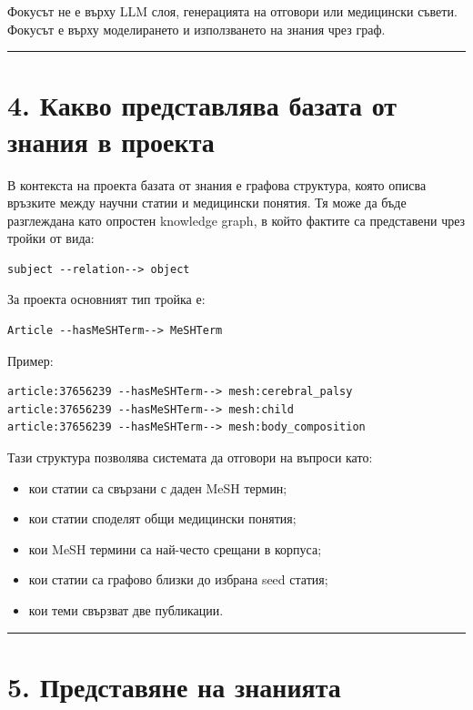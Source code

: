 \documentclass[12pt,a4paper]{article}
\providecommand{\tightlist}{\setlength{\itemsep}{0pt}\setlength{\parskip}{0pt}}
\begin{document}
Фокусът не е върху LLM слоя, генерацията на отговори или медицински съвети. Фокусът е върху моделирането и използването на знания чрез граф.

\vspace{0.5em}\hrule\vspace{1.0em}

\section{4. Какво представлява базата от знания в проекта}

В контекста на проекта базата от знания е графова структура, която описва връзките между научни статии и медицински понятия. Тя може да бъде разглеждана като опростен knowledge graph, в който фактите са представени чрез тройки от вида:

\begin{verbatim}
subject --relation--> object
\end{verbatim}

За проекта основният тип тройка е:

\begin{verbatim}
Article --hasMeSHTerm--> MeSHTerm
\end{verbatim}

Пример:

\begin{verbatim}
article:37656239 --hasMeSHTerm--> mesh:cerebral_palsy
article:37656239 --hasMeSHTerm--> mesh:child
article:37656239 --hasMeSHTerm--> mesh:body_composition
\end{verbatim}

Тази структура позволява системата да отговори на въпроси като:

\begin{itemize}
\tightlist
\item
  кои статии са свързани с даден MeSH термин;
\item
  кои статии споделят общи медицински понятия;
\item
  кои MeSH термини са най-често срещани в корпуса;
\item
  кои статии са графово близки до избрана seed статия;
\item
  кои теми свързват две публикации.
\end{itemize}

\vspace{0.5em}\hrule\vspace{1.0em}

\section{5. Представяне на знанията}
\end{document}
